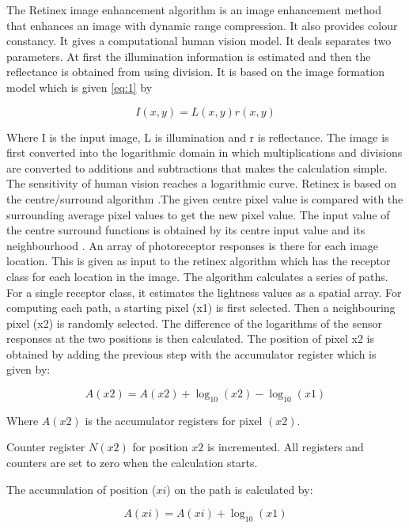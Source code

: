 The Retinex image enhancement algorithm is an image enhancement method that enhances an image with dynamic range compression. It also provides colour constancy. It gives a computational human vision model\cite{retines}. It deals separates two parameters. At first the illumination information is estimated and then the reflectance is obtained from using division. It is based on the image formation model which is given \ref{eq:1} by

\begin{equation}
	I (x, y) = L(x, y) r(x, y)
	\label{eq:1}
\end{equation}


Where I is the input image, L is illumination and r is reflectance. The image is first converted into the logarithmic domain in which multiplications and divisions are converted to additions and subtractions that makes the calculation simple. The sensitivity of human vision reaches a logarithmic curve. 
    Retinex is based on the centre/surround algorithm .The given centre pixel value is compared with the surrounding average pixel values to get the new pixel value. The input value of the centre surround functions is obtained by its centre input value and its neighbourhood \cite{ie2}.
	An array of photoreceptor responses is there for each image location. This is given as input to the retinex algorithm which has the receptor class for each location in the image. The algorithm calculates a series of paths. For a single receptor class, it estimates the lightness values as a spatial array.
	For computing each path, a starting pixel (x1) is first selected. Then a neighbouring pixel (x2) is randomly selected. The difference of the logarithms of the sensor responses at the two positions is then calculated.
	The position of pixel x2 is obtained by adding the previous step with the accumulator register which is given by:
	
	\begin{equation}
		A(x2) =A(x2) +\log_{10}(x2) −\log_{10}(x1)
	\end{equation}

Where $A(x2)$ is the accumulator registers for pixel $(x2)$.

Counter register $N(x2)$ for position $x2$ is incremented. All registers and counters are set to zero when the calculation starts.

The accumulation of position ($xi$) on the path is calculated by:

\begin{equation}
	A (xi) =A (xi) + \log_{10}(x1)
\end{equation}

